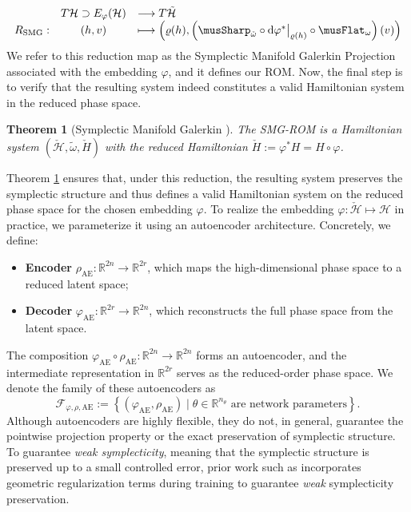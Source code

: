 \documentclass{article}
\theoremstyle{plain}
\newtheorem{theorem}{Theorem}[section]
\theoremstyle{definition}
\theoremstyle{remark}
\begin{document}
\begin{equation*}
\begin{array}{rcl}
& T\mathcal{H} \supset E_{\varphi}(\mathcal{H}) & \longrightarrow T\tilde{\mathcal{H}} \\
R_{\text{SMG}}: & (h, v) & \longmapsto \left( \varrho(h), \left({\musSharp_{\check{\omega}}}\circ {\mathrm{d}\varphi^*\big|_{\varrho(h)}} \circ {\musFlat_{\omega}} \right)(v) \right)
\end{array}
\end{equation*}
We refer to this reduction map as the Symplectic Manifold Galerkin Projection associated with the embedding $\varphi$, and it defines our ROM. Now, the final step is to verify that the resulting system indeed constitutes a valid Hamiltonian system in the reduced phase space.
\begin{theorem}[Symplectic Manifold Galerkin \cite{buchfink2024}]
\label{thm: SMG-ROM}
\textit{The SMG-ROM is a Hamiltonian system $(\check{\mathcal{H}}, \tilde{\omega}, \check{H})$ with the reduced Hamiltonian $\check{H} := \varphi^* H = H\circ \varphi$.}    
\end{theorem}
Theorem \ref{thm: SMG-ROM} ensures that, under this reduction, the resulting system preserves the symplectic structure and thus defines a valid Hamiltonian system on the reduced phase space for the chosen embedding $\varphi$.
To realize the embedding $\varphi : \check{\mathcal{H}} \mapsto \mathcal{H}$ in practice, we parameterize it using an autoencoder architecture. Concretely, we define:
\begin{itemize}
    \item \textbf{Encoder} $\rho_{\text{AE}} : \mathbb{R}^{2n} \rightarrow \mathbb{R}^{2r}$, which maps the high-dimensional phase space to a reduced latent space;
    \item \textbf{Decoder} $\varphi_{\text{AE}} : \mathbb{R}^{2r} \rightarrow \mathbb{R}^{2n}$, which reconstructs the full phase space from the latent space.
\end{itemize}
The composition $\varphi_{\text{AE}} \circ \rho_{\text{AE}} : \mathbb{R}^{2n} \rightarrow \mathbb{R}^{2n}$ forms an autoencoder, and the intermediate representation in $\mathbb{R}^{2r}$ serves as the reduced-order phase space. We denote the family of these autoencoders as
\begin{equation*}
   \mathcal{F}_{\varphi, \rho, \text{AE}} := \left\{ (\varphi_{\text{AE}}, \rho_{\text{AE}}) \mid \theta \in \mathbb{R}^{n_\theta} \text{ are network parameters} \right\}. 
\end{equation*}
Although autoencoders are highly flexible, they do not, in general, guarantee the pointwise projection property or the exact preservation of symplectic structure. To guarantee \emph{weak symplecticity}, meaning that the symplectic structure is preserved up to a small controlled error, prior work such as \cite{buchfink2021} incorporates geometric regularization terms during training to guarantee \emph{weak} symplecticity preservation.
\end{document}
